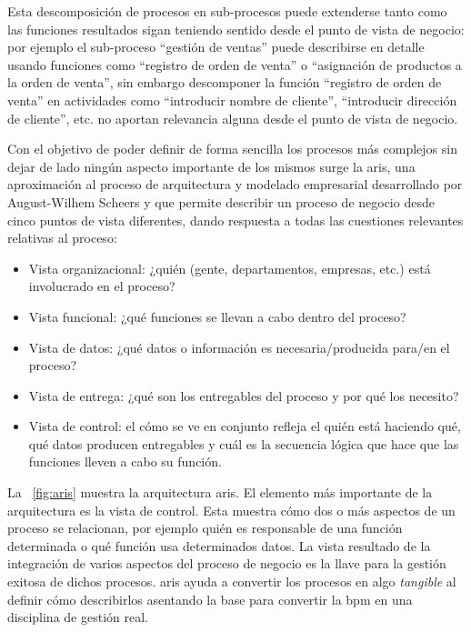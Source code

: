 Esta descomposición de procesos en sub-procesos puede extenderse tanto
como las funciones resultados sigan teniendo sentido desde el punto de
vista de negocio: por ejemplo el sub-proceso ``gestión de ventas'' puede describirse en detalle usando funciones como ``registro de orden de venta'' o ``asignación de productos a la orden de venta'', sin embargo descomponer la función ``registro de orden de venta'' en actividades como ``introducir nombre de cliente'', ``introducir dirección de cliente'', etc. no aportan relevancia alguna desde el punto de vista de negocio.

Con el objetivo de poder definir de forma sencilla los procesos más complejos sin dejar de lado ningún aspecto importante de los mismos surge la \acrfull{aris}, una aproximación al proceso de arquitectura y modelado empresarial desarrollado por August-Wilhem Scheers y que permite describir un proceso de negocio desde cinco puntos de vista diferentes, dando respuesta a todas las cuestiones relevantes relativas al proceso:
\begin{itemize}
\item Vista organizacional: ¿quién (gente, departamentos, empresas, etc.) está involucrado en el proceso?
\item Vista funcional: ¿qué funciones se llevan a cabo dentro del proceso?
\item Vista de datos: ¿qué datos o información es necesaria/producida para/en el proceso?
\item Vista de entrega: ¿qué son los entregables del proceso y por qué los necesito?
\item Vista de control: el cómo se ve en conjunto refleja el quién está haciendo qué, qué datos producen entregables y cuál es la secuencia lógica que hace que las funciones lleven a cabo su función.
\end{itemize}


La \figurename~\ref{fig:aris} muestra la arquitectura \acrshort{aris}.
El elemento más importante de la arquitectura es la vista de control. Esta muestra cómo dos o más aspectos de un proceso se relacionan, por ejemplo quién es responsable de una función determinada o qué función usa determinados datos. La vista resultado de la integración de varios aspectos del proceso de negocio es la llave para la gestión exitosa de dichos procesos. \acrshort{aris} ayuda a convertir los procesos en algo \textit{tangible} al definir cómo describirlos asentando la base para convertir la \acrfull{bpm} en una disciplina de gestión real.

